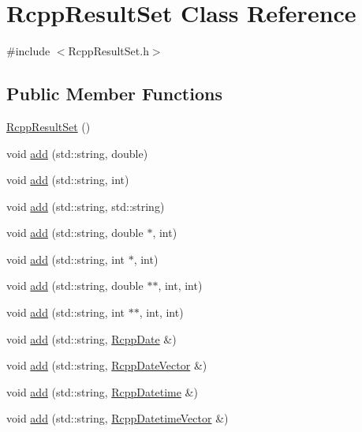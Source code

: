 \hypertarget{classRcppResultSet}{
\section{RcppResultSet Class Reference}
\label{classRcppResultSet}
}


{\ttfamily \#include $<$RcppResultSet.h$>$}\subsection*{Public Member Functions}
\begin{DoxyCompactItemize}
\item 
\hyperlink{classRcppResultSet_ab799c6b9bd730e55d92228203903ba74}{RcppResultSet} ()
\item 
void \hyperlink{classRcppResultSet_a7c7da37f18bd352303bf06b7c5233bc4}{add} (std::string, double)
\item 
void \hyperlink{classRcppResultSet_a8b7841ff8a52477b0c6a1fb7c03c0fd9}{add} (std::string, int)
\item 
void \hyperlink{classRcppResultSet_a2633372ab2f50b269e9e26dd7a489492}{add} (std::string, std::string)
\item 
void \hyperlink{classRcppResultSet_a5d06d8a4f0497abc6fad4ea22b4934f9}{add} (std::string, double $\ast$, int)
\item 
void \hyperlink{classRcppResultSet_a494dbe1f6db48bf48e9e33a32d897f29}{add} (std::string, int $\ast$, int)
\item 
void \hyperlink{classRcppResultSet_a88ff0e3db486eec0012eb58beee05e9b}{add} (std::string, double $\ast$$\ast$, int, int)
\item 
void \hyperlink{classRcppResultSet_a2cca9ea4e9554c4fad9bc326355c354c}{add} (std::string, int $\ast$$\ast$, int, int)
\item 
void \hyperlink{classRcppResultSet_ae5cb861a0d6e95cc7ed465ccae2ac4a7}{add} (std::string, \hyperlink{classRcppDate}{RcppDate} \&)
\item 
void \hyperlink{classRcppResultSet_ad7efd746596959ce68ca98c690a2f645}{add} (std::string, \hyperlink{classRcppDateVector}{RcppDateVector} \&)
\item 
void \hyperlink{classRcppResultSet_a1d921e7a24e50369ae67a1bc63826131}{add} (std::string, \hyperlink{classRcppDatetime}{RcppDatetime} \&)
\item 
void \hyperlink{classRcppResultSet_aac8cade970247a377e8dbebf1c79a86c}{add} (std::string, \hyperlink{classRcppDatetimeVector}{RcppDatetimeVector} \&)
\item 

\end{DoxyCompactItemize}
